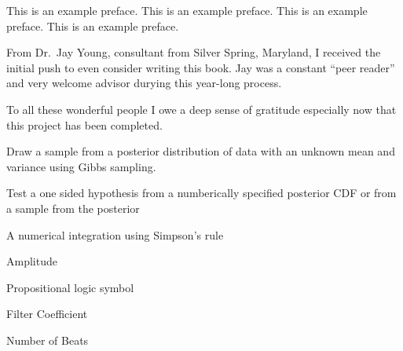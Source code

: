 \documentclass{wileySix}
\begin{document}
\begin{preface}
This is an example preface.
This is an example preface.
This is an example preface.
This is an example preface.


\end{preface}


\begin{acknowledgments}
From Dr.~Jay Young, consultant from Silver Spring, Maryland, I received
the initial push to even consider writing this book. Jay was a constant
``peer reader'' and very welcome advisor durying this year-long process.


To all these wonderful people I owe a deep sense of gratitude especially now
that this project has been completed.
\end{acknowledgments}

\begin{acronyms}
\end{acronyms}

\begin{glossary}
Draw a sample from a posterior distribution
of data with an unknown mean and variance using Gibbs sampling.

Test a one sided hypothesis from a numberically
specified posterior CDF or from a sample from the posterior

A numerical integration using Simpson's rule
\end{glossary}

\begin{symbols}
Amplitude

\term{\hbox{\&}}Propositional logic symbol 

Filter Coefficient

\bigskip

Number of Beats
\end{symbols}
\end{document}
